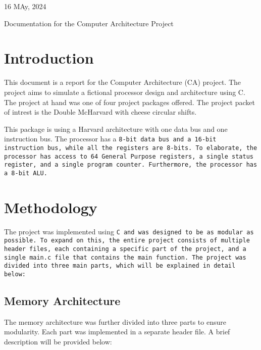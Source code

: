 \documentclass[a4paper,12pt]{article}
\begin{document}
\pagecolor{background}
\color{foreground}

\par{
	\flushleft\large
	16 MAy, 2024
}

\par{\Huge
	\flushleft{}
	Documentation for the Computer Architecture Project
}

\line

\section{Introduction}
	\par{
		This document is a report for the Computer Architecture (CA) project.
		The project aims to simulate a fictional processor design and
		architecture using C. The project at hand was one of four project
		packages offered. The project packet of intrest is the Double McHarvard
		with cheese circular shifts.
	}
	\par{
		This package is using a Harvard architecture with one data bus and one
		instruction bus. The processor has a \tt{8-bit} data bus and a
		\tt{16-bit} instruction bus, while all the registers are \tt{8-bits}.
		To elaborate, the processor has access to \tt{64} General Purpose
		registers, a single status register, and a single program counter.
		Furthermore, the processor has a \tt{8-bit} ALU. 
	}

\section{Methodology}
	\par{
		The project was implemented using \tt{C} and was designed to be as
		modular as possible. To expand on this, the entire project consists of
		multiple header files, each containing a specific part of the project,
		and a single \tt{main.c} file that contains the main function. The
		project was divided into three main parts, which will be explained in
		detail below:
	}
	\subsection{Memory Architecture}
		\par{
			The memory architecture was further divided into three parts to
			ensure modularity. Each part was implemented in a separate header
			file. A brief description will be provided below:
		}
\end{document}
